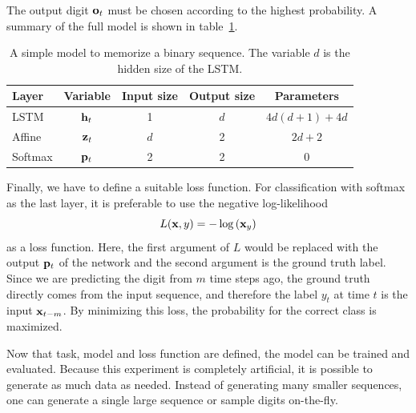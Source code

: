 	The output digit $\mathbf{o}_t$ must be chosen according to the highest probability.
	A summary of the full model is shown in table~\ref{tbl:model_classification_binary_digits}.
	\begin{table}
		\small
		\begin{center}
			\begin{tabular}{|l|c|c|c|c|}
				\hline
				Layer 	& Variable 			& Input size 	& Output size 	& Parameters 			\\ \hline
				LSTM 	& $\mathbf{h}_t$		& 1 			& $d$ 			& $4d(d + 1) + 4d$ 		\\ \hline
				Affine 	& $\mathbf{z}_t$		& $d$ 			& 2 			& $2d + 2$ 				\\ \hline
				Softmax & $\mathbf{p}_t$		& 2 			& 2 			& 0						\\ \hline
			\end{tabular}
		\end{center}
		\caption[A simple model to memorize a binary sequence]
				{A simple model to memorize a binary sequence. 
				 The variable $d$ is the hidden size of the LSTM.}
		\label{tbl:model_classification_binary_digits}
	\end{table}
	Finally, we have to define a suitable loss function. 
	For classification with softmax as the last layer, it is preferable to use the negative log-likelihood
	\begin{equation}
		L(\mathbf{x}, y) = -\log\left(\mathbf{x}_y\right)
	\end{equation}
	as a loss function. 
	Here, the first argument of $L$ would be replaced with the output $\mathbf{p}_t$ of the network and the second argument is the ground truth label. 
	Since we are predicting the digit from $m$ time steps ago, the ground truth directly comes from the input sequence, and therefore the label $y_t$ at time $t$ is the input $\mathbf{x}_{t - m}$.
	By minimizing this loss, the probability for the correct class is maximized.
	
	Now that task, model and loss function are defined, the model can be trained and evaluated.
	Because this experiment is completely artificial, it is possible to generate as much data as needed.
	Instead of generating many smaller sequences, one can generate a single large sequence or sample digits on-the-fly.
	
